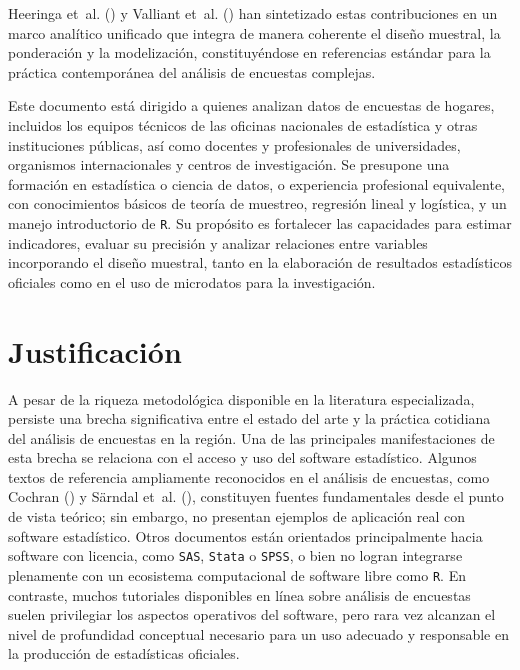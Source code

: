\documentclass[
  spanish,
  11pt,
  letterpaper,
  oneside,
  open=any]{scrbook}
\begin{document}
Heeringa et~al. () y
Valliant et~al. () han
sintetizado estas contribuciones en un marco analítico unificado que
integra de manera coherente el diseño muestral, la ponderación y la
modelización, constituyéndose en referencias estándar para la práctica
contemporánea del análisis de encuestas complejas.

Este documento está dirigido a quienes analizan datos de encuestas de
hogares, incluidos los equipos técnicos de las oficinas nacionales de
estadística y otras instituciones públicas, así como docentes y
profesionales de universidades, organismos internacionales y centros de
investigación. Se presupone una formación en estadística o ciencia de
datos, o experiencia profesional equivalente, con conocimientos básicos
de teoría de muestreo, regresión lineal y logística, y un manejo
introductorio de \texttt{R}. Su propósito es fortalecer las capacidades
para estimar indicadores, evaluar su precisión y analizar relaciones
entre variables incorporando el diseño muestral, tanto en la elaboración
de resultados estadísticos oficiales como en el uso de microdatos para
la investigación.

\section{Justificación}\label{justificacion}

A pesar de la riqueza metodológica disponible en la literatura
especializada, persiste una brecha significativa entre el estado del
arte y la práctica cotidiana del análisis de encuestas en la región. Una
de las principales manifestaciones de esta brecha se relaciona con el
acceso y uso del software estadístico. Algunos textos de referencia
ampliamente reconocidos en el análisis de encuestas, como Cochran
() y Särndal et~al.
(), constituyen fuentes
fundamentales desde el punto de vista teórico; sin embargo, no presentan
ejemplos de aplicación real con software estadístico. Otros documentos
están orientados principalmente hacia software con licencia, como
\texttt{SAS}, \texttt{Stata} o \texttt{SPSS}, o bien no logran
integrarse plenamente con un ecosistema computacional de software libre
como \texttt{R}. En contraste, muchos tutoriales disponibles en línea
sobre análisis de encuestas suelen privilegiar los aspectos operativos
del software, pero rara vez alcanzan el nivel de profundidad conceptual
necesario para un uso adecuado y responsable en la producción de
estadísticas oficiales.
\end{document}
